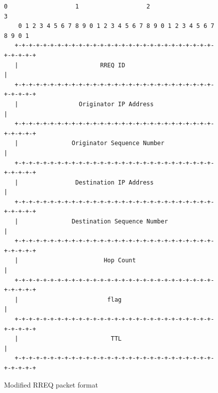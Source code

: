 \documentclass[]{nsm-thesis}
\begin{document}
\clearpage
\begin{figure}[h]
    \centering
    \begin{verbatim}
0                   1                   2                   3
    0 1 2 3 4 5 6 7 8 9 0 1 2 3 4 5 6 7 8 9 0 1 2 3 4 5 6 7 8 9 0 1
   +-+-+-+-+-+-+-+-+-+-+-+-+-+-+-+-+-+-+-+-+-+-+-+-+-+-+-+-+-+-+-+-+
   |                       RREQ ID                                 |
   +-+-+-+-+-+-+-+-+-+-+-+-+-+-+-+-+-+-+-+-+-+-+-+-+-+-+-+-+-+-+-+-+
   |                 Originator IP Address                         |
   +-+-+-+-+-+-+-+-+-+-+-+-+-+-+-+-+-+-+-+-+-+-+-+-+-+-+-+-+-+-+-+-+
   |               Originator Sequence Number                      |
   +-+-+-+-+-+-+-+-+-+-+-+-+-+-+-+-+-+-+-+-+-+-+-+-+-+-+-+-+-+-+-+-+
   |                Destination IP Address                         |
   +-+-+-+-+-+-+-+-+-+-+-+-+-+-+-+-+-+-+-+-+-+-+-+-+-+-+-+-+-+-+-+-+
   |               Destination Sequence Number                     |
   +-+-+-+-+-+-+-+-+-+-+-+-+-+-+-+-+-+-+-+-+-+-+-+-+-+-+-+-+-+-+-+-+
   |                        Hop Count                              |
   +-+-+-+-+-+-+-+-+-+-+-+-+-+-+-+-+-+-+-+-+-+-+-+-+-+-+-+-+-+-+-+-+
   |                         flag                                  |
   +-+-+-+-+-+-+-+-+-+-+-+-+-+-+-+-+-+-+-+-+-+-+-+-+-+-+-+-+-+-+-+-+
   |                          TTL                                  |
   +-+-+-+-+-+-+-+-+-+-+-+-+-+-+-+-+-+-+-+-+-+-+-+-+-+-+-+-+-+-+-+-+
    \end{verbatim}
    \caption{Modified RREQ packet format}
\end{figure}
\end{document}
